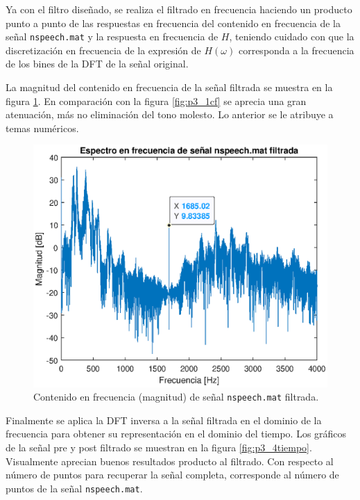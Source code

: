 Ya con el filtro diseñado, se realiza el filtrado en frecuencia haciendo un producto punto a punto de las respuestas en frecuencia del contenido en frecuencia de la señal \texttt{nspeech.mat} y la respuesta en frecuencia de $H$, teniendo cuidado con que la discretización en frecuencia de la expresión de $H(\omega)$ corresponda a la frecuencia de los bines de la DFT de la señal original.

La magnitud del contenido en frecuencia de la señal filtrada se muestra en la figura \ref{fig:p3_3cffilt}. En comparación con la figura \ref{fig:p3_1cf} se aprecia una gran atenuación, más no eliminación del tono molesto. Lo anterior se le atribuye a temas numéricos.

\begin{figure}[H]
    \centering
    \includegraphics[width = .8\linewidth]{Figuras/p3_3cffilt.eps}
    \caption{Contenido en frecuencia (magnitud) de señal \texttt{nspeech.mat} filtrada.}
    \label{fig:p3_3cffilt}
\end{figure}

Finalmente se aplica la DFT inversa a la señal filtrada en el dominio de la frecuencia para obtener su representación en el dominio del tiempo. Los gráficos de la señal pre y post filtrado se muestran en la figura \ref{fig:p3_4tiempo}. Visualmente aprecian buenos resultados producto al filtrado. Con respecto al número de puntos para recuperar la señal completa, corresponde al número de puntos de la señal \texttt{nspeech.mat}.

